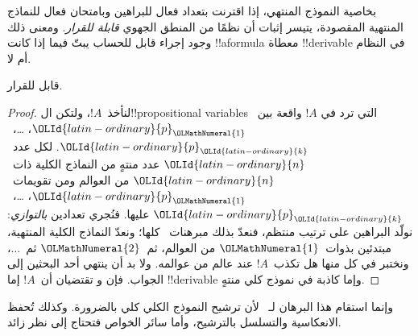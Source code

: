 \documentclass[../../../include/open-logic-section]{subfiles}
\begin{document}

بخاصية النموذج المنتهي، إذا اقترنت بتعداد فعال للبراهين وبامتحان فعال
للنماذج المنتهية المقصودة، يتيسر إثبات أن نظمًا من المنطق الجهوي
\emph{قابلة للقرار}. ومعنى ذلك وجود إجراء قابل للحساب يبتّ فيما إذا
كانت !!a{formula} معطاة !!{derivable} في النظام أم لا.

\begin{thm}
   قابل للقرار.
\end{thm}

\begin{proof}
  لنأخذ~$!A$، ولتكن ال!!{propositional variable}s التي ترد في
  $!A$ واقعة بين~${\OLId{latin-ordinary}{p}}_{\OLMathNumeral{1}}$، \dots،~${\OLId{latin-ordinary}{p}}_{\OLId{latin-ordinary}{k}}$. لكل عدد~${\OLId{latin-ordinary}{n}}$ عدد منتهٍ من
  النماذج الكلية ذات~${\OLId{latin-ordinary}{n}}$ من العوالم ومن تقويمات~${\OLId{latin-ordinary}{p}}_{\OLMathNumeral{1}}$،
  \dots،~${\OLId{latin-ordinary}{p}}_{\OLId{latin-ordinary}{k}}$ عليها. فنُجري تعدادين \emph{بالتوازي}: نولّد البراهين
  على ترتيب منتظم، فنعدّ بذلك مبرهنات~ كلها؛ ونعدّ النماذج
  الكلية المنتهية، مبتدئين بذوات~${\OLMathNumeral{1}}$ من العوالم، ثم~${\OLMathNumeral{2}}$ ثم~$\dots$،
  ونختبر في كل منها هل تكذب~$!A$ عند عالم من عوالمه.
  ولا بد أن ينتهي أحد البحثين إلى الجواب. فإن
   و
  تقتضيان أن~$!A$ إما !!{derivable} وإما كاذبة في نموذج كلي منتهٍ.
\end{proof}

وإنما استقام هذا البرهان لـ~ لأن ترشيح النموذج الكلي كلي
بالضرورة. وكذلك تُحفظ الانعكاسية والتسلسل بالترشيح، وأما سائر الخواص
فتحتاج إلى نظر زائد.
\end{document}
